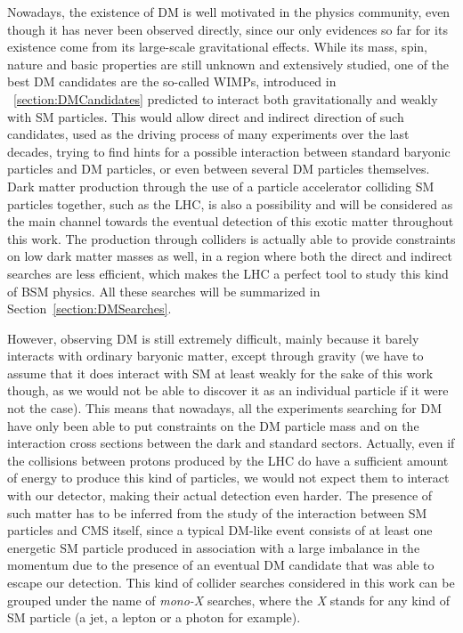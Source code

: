 \documentclass[a4paper, 10pt, openright]{report}
\begin{document}
Nowadays, the existence of \ac{DM} is well motivated in the physics community, even though it has never been observed directly, since our only evidences so far for its existence come from its large-scale gravitational effects. While its mass, spin, nature and basic properties are still unknown and extensively studied, one of the best \ac{DM} candidates are the so-called \acp{WIMP}, introduced in ~\ref{section:DMCandidates} predicted to interact both gravitationally and weakly with \ac{SM} particles. This would allow direct and indirect direction of such candidates, used as the driving process of many experiments over the last decades, trying to find hints for a possible interaction between standard baryonic particles and \ac{DM} particles, or even between several \ac{DM} particles themselves. Dark matter production through the use of a particle accelerator colliding \ac{SM} particles together, such as the \ac{LHC}, is also a possibility and will be considered as the main channel towards the eventual detection of this exotic matter throughout this work. The production through colliders is actually able to provide constraints on low dark matter masses as well, in a region where both the direct and indirect searches are less efficient, which makes the \ac{LHC} a perfect tool to study this kind of \ac{BSM} physics. All these searches will be summarized in Section~\ref{section:DMSearches}.

However, observing \ac{DM} is still extremely difficult, mainly because it barely interacts with ordinary baryonic matter, except through gravity (we have to assume that it does interact with \ac{SM} at least weakly for the sake of this work though, as we would not be able to discover it as an individual particle if it were not the case). This means that nowadays, all the experiments searching for \ac{DM} have only been able to put constraints on the \ac{DM} particle mass and on the interaction cross sections between the dark and standard sectors. Actually, even if the collisions between protons produced by the LHC do have a sufficient amount of energy to produce this kind of particles, we would not expect them to interact with our detector, making their actual detection even harder. The presence of such matter has to be inferred from the study of the interaction between \ac{SM} particles and \ac{CMS} itself, since a typical \ac{DM}-like event consists of at least one energetic \ac{SM} particle produced in association with a large imbalance in the momentum due to the presence of an eventual \ac{DM} candidate that was able to escape our detection. This kind of collider searches considered in this work can be grouped under the name of \textit{mono-X} searches, where the \textit{X} stands for any kind of \ac{SM} particle (a jet, a lepton or a photon for example). 
\end{document}

